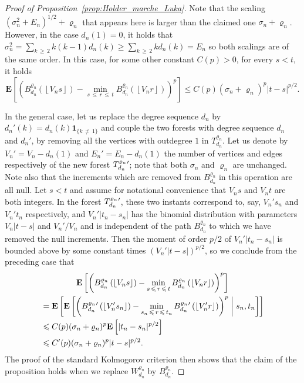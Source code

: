 \documentclass[AHL,Unicode,longabstracts,published]{cedram}
\newcommand{\ensembles}[1]{\mathbf{#1}}
\newcommand{\E}{\ensembles{E}}
\newcommand{\Es}[1]{\E\left[#1\right]}
\newcommand{\Esc}[2]{\E\left[#1 \;\middle|\; #2\right]}
\newcommand{\1}{\ensembles{1}}
\newcommand{\ind}[1]{\1_{\{#1\}}}
\renewcommand{\le}{\leqslant}
\renewcommand{\ge}{\geqslant}
\newcommand{\fn}{T_{d_n}^{\varrho_n}}
\newcommand{\Wfn}{W_{d_n}^{\varrho_n}}
\newcommand{\Bfn}{B_{d_n}^{\varrho_n}}
\newcommand{\edges}{E}
\newcommand{\vertices}{V}
\begin{document}
\begin{proof}[Proof of Proposition~\ref{prop:Holder_marche_Luka}]
Note that the scaling $(\sigma_n^{2}+\edges_{n})^{1/2} + \varrho_n$ that appears here is larger than the claimed one $\sigma_n + \varrho_n$. However, in the case $d_{n}(1) = 0$, it holds that $\sigma_{n}^{2} = \sum_{k\,\ge\, 2} k(k-1)d_{n}(k) \ge \sum_{k\,\ge\,2} kd_{n}(k) = \edges_{n}$ so both scalings are of the same order. In this case, for some other constant $C(p) > 0$, for every $s<t$, it holds
\[
\Es{\left(\Bfn\left(\left\lfloor\vertices_ns\right\rfloor\right) - \min_{s\,\le\,r\,\le\,t} \Bfn\left(\left\lfloor\vertices_nr\right\rfloor\right)\right)^p}
\le C(p) \left(\sigma_n + \varrho_n\right)^p |t-s|^{p/2}.
\]

In the general case, let us replace the degree sequence $d_n$ by $d_n'(k) = d_n(k) \ind{k\,\ne\,1}$ and couple the two forests with degree sequence $d_n$ and $d_n'$, by removing all the vertices with outdegree $1$ in $\fn$. Let us denote by $\vertices_{n}' = \vertices_{n}-d_{n}(1)$ and $\edges_{n}' = \edges_{n}-d_{n}(1)$ the number of vertices and edges respectively of the new forest ${\fn}\vphantom{T}'$; note that both $\sigma_n$ and $\varrho_{n}$ are unchanged. Note also that the increments which are removed from $\Bfn$ in this operation are all null. Let $s<t$ and assume for notational convenience that $\vertices_{n}s$ and $\vertices_{n} t$ are both integers. In the forest ${\fn}\vphantom{T}'$, these two instants correspond to, say, $\vertices_{n}'s_{n}$ and $\vertices_{n}'t_{n}$ respectively, and $\vertices_{n}' |t_{n}-s_{n}|$ has the binomial distribution with parameters $\vertices_{n} |t-s|$ and $\vertices_{n}'/\vertices_{n}$ and is independent of the path $\Bfn$ to which we have removed the null increments. Then the moment of order $p/2$ of $\vertices_{n}' |t_{n}-s_{n}|$ is bounded above by some constant times $(\vertices_{n}' |t-s|)^{p/2}$, so we conclude from the preceding case that
\begin{multline*}
\Es{\left(\Bfn\left(\left\lfloor\vertices_ns\right\rfloor\right) - \min_{s\,\le\,r\,\le\,t} \Bfn\left(\left\lfloor\vertices_nr\right\rfloor\right)\right)^p}
\\
\begin{aligned}
&= \Es{\Esc{\left(\Bfn\vphantom{B}'\left(\left\lfloor\vertices_n' s_{n}\right\rfloor\right) - \min_{s_{n}\,\le\,r\,\le\,t_{n}} \Bfn\vphantom{B}'\left(\left\lfloor\vertices_n' r\right\rfloor\right)\right)^p}{s_{n}, t_{n}}}
\\
&\le C(p) (\sigma_n + \varrho_n)^p \Es{|t_{n}-s_{n}|^{p/2}}
\\
&\le C'(p) (\sigma_n + \varrho_n)^p |t-s|^{p/2}.
\end{aligned}
\end{multline*}
The proof of the standard Kolmogorov criterion then shows that the claim of the proposition holds when we replace $\Wfn$ by $\Bfn$.



\end{proof}
\end{document}
